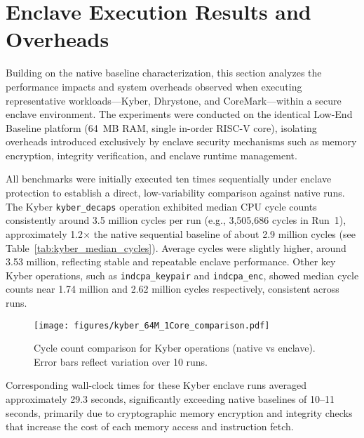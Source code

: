\section{Enclave Execution Results and Overheads}
\label{sec:enclave-execution}

Building on the native baseline characterization, this section analyzes the performance impacts and system overheads observed when executing representative workloads—Kyber, Dhrystone, and CoreMark—within a secure enclave environment. The experiments were conducted on the identical Low-End Baseline platform (64~MB RAM, single in-order RISC-V core), isolating overheads introduced exclusively by enclave security mechanisms such as memory encryption, integrity verification, and enclave runtime management.

All benchmarks were initially executed ten times sequentially under enclave protection to establish a direct, low-variability comparison against native runs. The Kyber \texttt{kyber\_decaps} operation exhibited median CPU cycle counts consistently around 3.5 million cycles per run (e.g., 3,505,686 cycles in Run~1), approximately 1.2$\times$ the native sequential baseline of about 2.9 million cycles (see Table~\ref{tab:kyber_median_cycles}). Average cycles were slightly higher, around 3.53 million, reflecting stable and repeatable enclave performance. Other key Kyber operations, such as \texttt{indcpa\_keypair} and \texttt{indcpa\_enc}, showed median cycle counts near 1.74 million and 2.62 million cycles respectively, consistent across runs.

\begin{figure}[h]
    \centering
    \texttt{[image: figures/kyber\_64M\_1Core\_comparison.pdf]}
    \caption{Cycle count comparison for Kyber operations (native vs enclave). Error bars reflect variation over 10 runs.}
    \label{fig:kyber_cycles}
\end{figure}

Corresponding wall-clock times for these Kyber enclave runs averaged approximately 29.3 seconds, significantly exceeding native baselines of 10--11 seconds, primarily due to cryptographic memory encryption and integrity checks that increase the cost of each memory access and instruction fetch.


